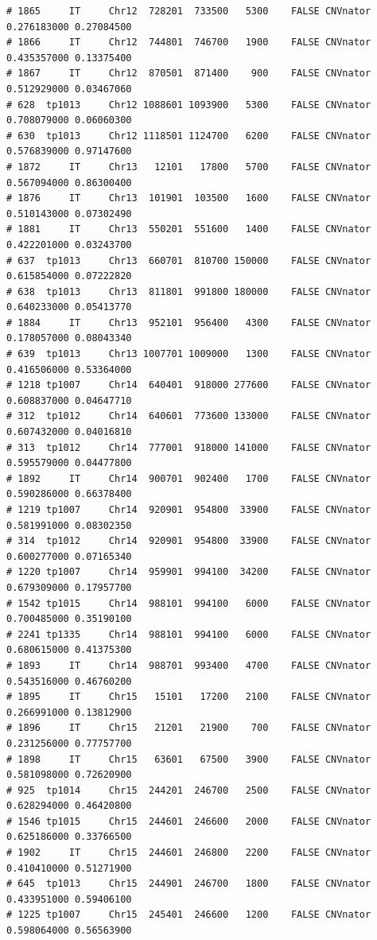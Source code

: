 \documentclass{article}\usepackage[]{graphicx}\usepackage[]{color}
\makeatletter
\newenvironment{kframe}{%
 \def\at@end@of@kframe{}%
 \ifinner\ifhmode%
  \def\at@end@of@kframe{\end{minipage}}%
  \begin{minipage}{\columnwidth}%
 \fi\fi%
 \def\FrameCommand##1{\hskip\@totalleftmargin \hskip-\fboxsep
 \colorbox{shadecolor}{##1}\hskip-\fboxsep
     \hskip-\linewidth \hskip-\@totalleftmargin \hskip\columnwidth}%
 \MakeFramed {\advance\hsize-\width
   \@totalleftmargin\z@ \linewidth\hsize
   \@setminipage}}%
 {\par\unskip\endMakeFramed%
 \at@end@of@kframe}
\newenvironment{knitrout}{}{} %
\makeatother
\begin{document}
\begin{knitrout}
\begin{kframe}
\begin{verbatim}
# 1865     IT     Chr12  728201  733500   5300    FALSE CNVnator 0.276183000 0.27084500
# 1866     IT     Chr12  744801  746700   1900    FALSE CNVnator 0.435357000 0.13375400
# 1867     IT     Chr12  870501  871400    900    FALSE CNVnator 0.512929000 0.03467060
# 628  tp1013     Chr12 1088601 1093900   5300    FALSE CNVnator 0.708079000 0.06060300
# 630  tp1013     Chr12 1118501 1124700   6200    FALSE CNVnator 0.576839000 0.97147600
# 1872     IT     Chr13   12101   17800   5700    FALSE CNVnator 0.567094000 0.86300400
# 1876     IT     Chr13  101901  103500   1600    FALSE CNVnator 0.510143000 0.07302490
# 1881     IT     Chr13  550201  551600   1400    FALSE CNVnator 0.422201000 0.03243700
# 637  tp1013     Chr13  660701  810700 150000    FALSE CNVnator 0.615854000 0.07222820
# 638  tp1013     Chr13  811801  991800 180000    FALSE CNVnator 0.640233000 0.05413770
# 1884     IT     Chr13  952101  956400   4300    FALSE CNVnator 0.178057000 0.08043340
# 639  tp1013     Chr13 1007701 1009000   1300    FALSE CNVnator 0.416506000 0.53364000
# 1218 tp1007     Chr14  640401  918000 277600    FALSE CNVnator 0.608837000 0.04647710
# 312  tp1012     Chr14  640601  773600 133000    FALSE CNVnator 0.607432000 0.04016810
# 313  tp1012     Chr14  777001  918000 141000    FALSE CNVnator 0.595579000 0.04477800
# 1892     IT     Chr14  900701  902400   1700    FALSE CNVnator 0.590286000 0.66378400
# 1219 tp1007     Chr14  920901  954800  33900    FALSE CNVnator 0.581991000 0.08302350
# 314  tp1012     Chr14  920901  954800  33900    FALSE CNVnator 0.600277000 0.07165340
# 1220 tp1007     Chr14  959901  994100  34200    FALSE CNVnator 0.679309000 0.17957700
# 1542 tp1015     Chr14  988101  994100   6000    FALSE CNVnator 0.700485000 0.35190100
# 2241 tp1335     Chr14  988101  994100   6000    FALSE CNVnator 0.680615000 0.41375300
# 1893     IT     Chr14  988701  993400   4700    FALSE CNVnator 0.543516000 0.46760200
# 1895     IT     Chr15   15101   17200   2100    FALSE CNVnator 0.266991000 0.13812900
# 1896     IT     Chr15   21201   21900    700    FALSE CNVnator 0.231256000 0.77757700
# 1898     IT     Chr15   63601   67500   3900    FALSE CNVnator 0.581098000 0.72620900
# 925  tp1014     Chr15  244201  246700   2500    FALSE CNVnator 0.628294000 0.46420800
# 1546 tp1015     Chr15  244601  246600   2000    FALSE CNVnator 0.625186000 0.33766500
# 1902     IT     Chr15  244601  246800   2200    FALSE CNVnator 0.410410000 0.51271900
# 645  tp1013     Chr15  244901  246700   1800    FALSE CNVnator 0.433951000 0.59406100
# 1225 tp1007     Chr15  245401  246600   1200    FALSE CNVnator 0.598064000 0.56563900

\end{verbatim}
\end{kframe}
\end{knitrout}
\end{document}
